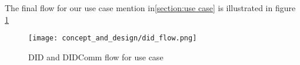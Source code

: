 The final flow for our use case mention in\ref{section:use case} is illustrated in figure \ref{fig:did_flow}

\begin{figure}[h]
  \centering
  \texttt{[image: concept\_and\_design/did\_flow.png]}
  \caption{DID and DIDComm flow for use case}
  \label{fig:did_flow}
\end{figure}





















